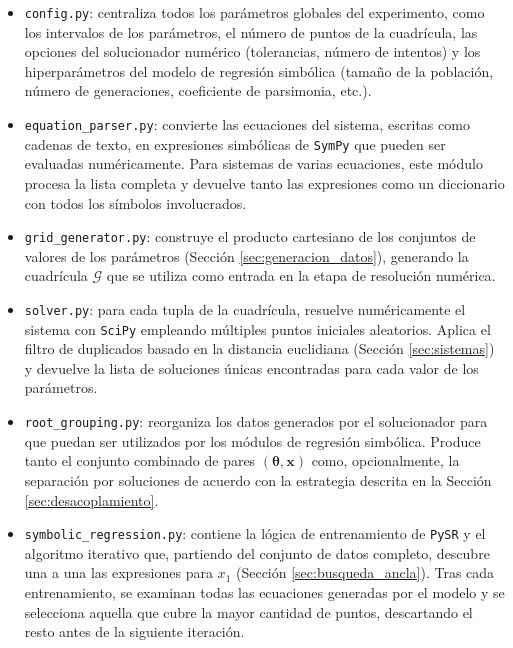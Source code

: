 \documentclass{article} \usepackage[utf8]{inputenc} \usepackage[spanish]{babel} \usepackage{amsmath, amssymb, amsthm} \usepackage{bm} \usepackage{float} \usepackage{longtable} \usepackage[hidelinks]{hyperref}
\newcommand{\xvec}{\mathbf{x}} \newcommand{\thetavec}{\boldsymbol{\theta}} \newcommand{\Fvec}{\mathbf{F}} \newcommand{\R}{\mathbb{R}} \newcommand{\norm}[1]{\left\lVert#1\right\rVert} \newcommand{\loss}{\mathcal{L}} \newcommand{\dataset}{\mathcal{D}} \newcommand{\jac}{\mathbf{J}}
\begin{document}
\begin{itemize} \item \texttt{config.py}: centraliza todos los parámetros globales del experimento, como los intervalos de los parámetros, el número de puntos de la cuadrícula, las opciones del solucionador numérico (tolerancias, número de intentos) y los hiperparámetros del modelo de regresión simbólica (tamaño de la población, número de generaciones, coeficiente de parsimonia, etc.).

    \item \texttt{equation\_parser.py}: convierte las ecuaciones del sistema, escritas como cadenas de texto, en expresiones simbólicas de \texttt{SymPy} \cite{sympy} que pueden ser evaluadas numéricamente. Para sistemas de varias ecuaciones, este módulo procesa la lista completa y devuelve tanto las expresiones como un diccionario con todos los símbolos involucrados.

    \item \texttt{grid\_generator.py}: construye el producto cartesiano de los conjuntos de valores de los parámetros (Sección \ref{sec:generacion_datos}), generando la cuadrícula \(\mathcal{G}\) que se utiliza como entrada en la etapa de resolución numérica.

    \item \texttt{solver.py}: para cada tupla de la cuadrícula, resuelve numéricamente el sistema con \texttt{SciPy} \cite{virtanen2020scipy} empleando múltiples puntos iniciales aleatorios. Aplica el filtro de duplicados basado en la distancia euclidiana (Sección \ref{sec:sistemas}) y devuelve la lista de soluciones únicas encontradas para cada valor de los parámetros.

    \item \texttt{root\_grouping.py}: reorganiza los datos generados por el solucionador para que puedan ser utilizados por los módulos de regresión simbólica. Produce tanto el conjunto combinado de pares \((\thetavec, \xvec)\) como, opcionalmente, la separación por soluciones de acuerdo con la estrategia descrita en la Sección \ref{sec:desacoplamiento}.

    \item \texttt{symbolic\_regression.py}: contiene la lógica de entrenamiento de \texttt{PySR} \cite{cranmer2023pysr} y el algoritmo iterativo que, partiendo del conjunto de datos completo, descubre una a una las expresiones para \(x_1\) (Sección \ref{sec:busqueda_ancla}). Tras cada entrenamiento, se examinan todas las ecuaciones generadas por el modelo y se selecciona aquella que cubre la mayor cantidad de puntos, descartando el resto antes de la siguiente iteración.


\end{itemize}
\end{document}
